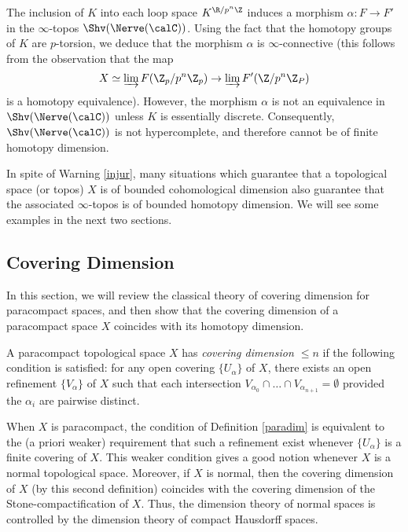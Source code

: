 \begin{warning}
The inclusion of $K$ into each loop space $K^{ \R / p^{n} \Z}$ induces a morphism
$\alpha: F \rightarrow F'$ in the $\infty$-topos $\Shv( \Nerve(\calC) )$. Using the fact
that the homotopy groups of $K$ are $p$-torsion, we deduce that the morphism
$\alpha$ is $\infty$-connective (this follows from the observation that the map
$$X \simeq \varinjlim F( \Z_p / p^{n} \Z_p) \rightarrow
\varinjlim F'( \Z / p^{n} \Z_P)$$ is a homotopy equivalence). However,
the morphism $\alpha$ is not an equivalence in $\Shv( \Nerve(\calC) )$ unless $K$ is essentially discrete. Consequently, $\Shv( \Nerve(\calC) )$ is not hypercomplete, and therefore cannot be of finite homotopy dimension.
\end{warning}

In spite of Warning \ref{injur}, many situations which guarantee that a topological space (or topos)
$X$ is of bounded cohomological dimension also guarantee that the associated $\infty$-topos is
of bounded homotopy dimension. We will see some examples in the next two sections.

\subsection{Covering Dimension}\label{covdim}

In this section, we will review the classical theory of covering
dimension for paracompact spaces, and then show that the covering
dimension of a paracompact space $X$ coincides with its homotopy
dimension.

\begin{definition}\label{paradim}
A paracompact topological space $X$ has {\it covering
dimension $\leq n$} if the following condition is satisfied: for
any open covering $\{ U_{\alpha} \}$ of $X$, there exists an open
refinement $\{ V_{\alpha} \}$ of $X$ such that each intersection
$V_{\alpha_0} \cap \ldots \cap V_{\alpha_{n+1}} = \emptyset$
provided the $\alpha_i$ are pairwise distinct.
\end{definition}

\begin{remark}
When $X$ is paracompact, the condition of Definition \ref{paradim}
is equivalent to the (a priori weaker) requirement that such a refinement exist whenever
$\{U_{\alpha} \}$ is a finite covering of $X$. This weaker
condition gives a good notion whenever $X$ is a normal topological
space. Moreover, if $X$ is normal, then the covering dimension of
$X$ (by this second definition) coincides with the covering dimension of
the Stone-\Cech compactification of $X$. Thus, the dimension
theory of normal spaces is controlled by the dimension theory of
compact Hausdorff spaces.
\end{remark}

